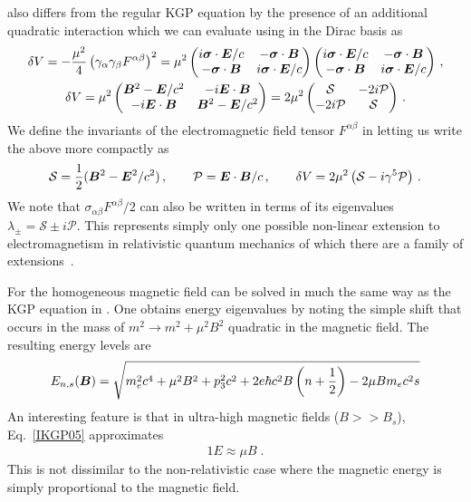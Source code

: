  also differs from the regular KGP equation by the presence of an additional quadratic interaction which we can evaluate using  in the Dirac basis as
\begin{gather}
    \label{quad:1} \delta V=-\frac{\mu^{2}}{4}\left(\gamma_{\alpha}\gamma_{\beta}F^{\alpha\beta}\right)^{2}=\mu^{2}
    \begin{pmatrix}
        i\boldsymbol{\sigma}\cdot\boldsymbol{E}/c & -\boldsymbol{\sigma}\cdot\boldsymbol{B} \\
        -\boldsymbol{\sigma}\cdot\boldsymbol{B} & i\boldsymbol{\sigma}\cdot\boldsymbol{E}/c
    \end{pmatrix}
    \begin{pmatrix}
        i\boldsymbol{\sigma}\cdot\boldsymbol{E}/c & -\boldsymbol{\sigma}\cdot\boldsymbol{B} \\
        -\boldsymbol{\sigma}\cdot\boldsymbol{B} & i\boldsymbol{\sigma}\cdot\boldsymbol{E}/c
    \end{pmatrix}\,,\\
    \label{quad:2}
    \delta V = \mu^{2}
    \begin{pmatrix}
        \boldsymbol{B}^{2}-\boldsymbol{E}/c^{2} & -i\boldsymbol{E}\cdot\boldsymbol{B} \\
        -i\boldsymbol{E}\cdot\boldsymbol{B} & \boldsymbol{B}^{2}-\boldsymbol{E}/c^{2}
    \end{pmatrix}=2\mu^{2}
    \begin{pmatrix}
        \mathcal{S} & -2i\mathcal{P} \\
        -2i\mathcal{P} & \mathcal{S}
    \end{pmatrix}\,.
\end{gather}
We define the invariants of the electromagnetic field tensor $F^{\alpha\beta}$ in   letting us write the above more compactly as
\begin{alignat}{1}
    \label{inv:1} \mathcal{S}=\frac{1}{2}(\boldsymbol{B}^{2}-\boldsymbol{E}^{2}/c^{2})\,,\qquad
    \mathcal{P}=\boldsymbol{E}\cdot\boldsymbol{B}/c\,,\qquad
    \delta V=2\mu^{2}\left(\mathcal{S}-i\gamma^{5}\mathcal{P}\right)\,.
\end{alignat}
We note that $\sigma_{\alpha\beta}F^{\alpha\beta}/2$ can also be written in terms of its eigenvalues $\lambda_{\pm}=\mathcal{S}\pm i\mathcal{P}$. This represents simply only one possible non-linear extension to electromagnetism in relativistic quantum mechanics of which there are a family of extensions~\citep{Foldy:1952a}.

For the homogeneous magnetic field  can be solved in much the same way as the KGP equation in . One obtains energy eigenvalues by noting the simple shift that occurs in the mass of $m^2\rightarrow m^{2}+\mu^{2}{B}^{2}$ quadratic in the magnetic field. The resulting energy levels are
\begin{alignat}{1}
\label{IKGP05} E_{n,s}(\boldsymbol{B})=\sqrt{m_{e}^{2}c^{4}+\mu^{2}{B}^{2}+p_{3}^{2}c^{2}+2e\hbar c^{2}B\left(n+\frac{1}{2}\right)-2\mu B m_{e}c^{2}s}
\end{alignat}
An interesting feature is that in ultra-high magnetic fields ($B>>{B}_{s}$), Eq.~\eqref{IKGP05} approximates
\begin{alignat}{1}
\label{IKGP07} E\approx\mu B\;.
\end{alignat}
This is not dissimilar to the non-relativistic case where the magnetic energy is simply proportional to the magnetic field.

